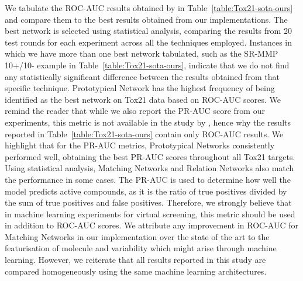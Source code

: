 We tabulate the ROC-AUC results obtained by \citet{altae2017low} in Table~\ref{table:Tox21-sota-ours} and compare them to the best results obtained from our implementations. The best network is selected using statistical analysis, comparing the results from 20 test rounds for each experiment across all the techniques employed. Instances in which we have more than one best network tabulated, such as the SR-MMP 10+/10- example in Table~\ref{table:Tox21-sota-ours}, indicate that we do not find any statistically significant difference between the results obtained from that specific technique. Prototypical Network has the highest frequency of being identified as the best network on Tox21 data based on ROC-AUC scores. We remind the reader that while we also report the PR-AUC score from our experiments, this metric is not available in the study by \citet{altae2017low}, hence why the results reported in Table~\ref{table:Tox21-sota-ours} contain only ROC-AUC results. We highlight that for the PR-AUC metrics, Prototypical Networks consistently performed well, obtaining the best PR-AUC scores throughout all Tox21 targets. Using statistical analysis, Matching Networks and Relation Networks also match the performance in some cases. The PR-AUC is used to determine how well the model predicts active compounds, as it is the ratio of true positives divided by the sum of true positives and false positives. Therefore, we strongly believe that in machine learning experiments for virtual screening, this metric should be used in addition to ROC-AUC scores. We attribute any improvement in ROC-AUC for Matching Networks in our implementation over the state of the art to the featurisation of molecule and variability which might arise through machine learning. However, we reiterate that all results reported in this study are compared homogeneously using the same machine learning architectures. 

